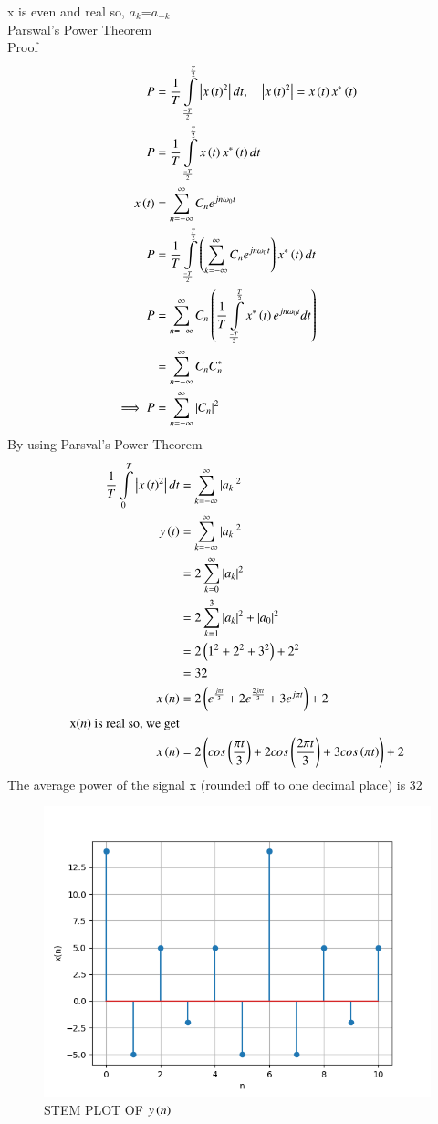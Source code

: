 \documentclass[a4,12pt,onecolumn]{IEEEtran}
\begin{document}
x is even and real so, $a_k$=$a_{-k}$\\
Parswal's Power Theorem\\
Proof
\begin{align}
P&=\frac{1}{T}\int\limits_{\frac{-T}{2}}^{\frac{T}{2}}\left| x\left(t\right)^2 \right|dt ,\quad{\left| x\ensuremath{\left(t\right)}^2 \right|=x\ensuremath{\left(t\right)}x^*\ensuremath{\left(t\right)}}\\
P&=\frac{1}{T}\int\limits_{\frac{-T}{2}}^{\frac{T}{2}}x\left(t\right)x^*\left(t\right)dt \\
x\left(t\right)&=\sum\limits_{n=-\infty}^{\infty}C_ne^{jn\omega_0t}\\
P&=\frac{1}{T}\int\limits_{\frac{-T}{2}}^{\frac{T}{2}}\left(\sum\limits_{k=-\infty}^{\infty}C_ne^{jn\omega_0t}\right)x^*\left(t\right)dt\\
P&=\sum\limits_{n=-\infty}^{\infty}C_n\left(\frac{1}{T}\int\limits_{\frac{-T}{2}}^{\frac{T}{2}}x^*\left(t\right)e^{jn\omega_0t}dt\right)\\
&=\sum\limits_{n=-\infty}^{\infty}C_nC^*_n\\
\implies P&=\sum\limits_{n=-\infty}^{\infty}\left| C_n \right|^2
\end{align}
By using Parsval's Power Theorem
\begin{align}
\frac{1}{T}\int\limits_{0}^{T}\left| x\left(t\right)^2 \right|dt&=\sum\limits_{k=-\infty}^{\infty}\left| a_k \right|^2\\
y\left(t\right)&=\sum\limits_{k=-\infty}^{\infty}\left| a_k \right|^2\\
&=2\sum\limits_{k=0}^{\infty}\left| a_k \right|^2\\
&=2\sum\limits_{k=1}^{3}\left| a_k \right|^2  +|a_0|^2 \\
&=2\left(1^2+2^2+3^2\right)+2^2\\
&=32\\
x\left(n\right)&=2\left(e^{\frac{j\pi t}{3}}+2e^{\frac{2j\pi t}{3}}+3e^{j\pi t}\right) + 2\\
\text{x\ensuremath{\left(n\right)} is real so, we get}\\
x\left(n\right)&=2\left(cos\left(\frac{\pi t}{3}\right)+2cos\left(\frac{2\pi t}{3}\right)+3cos\left(\pi t\right)\right) + 2
\end{align}
The average power of the signal x (rounded off to one decimal place) is $32$
\begin{figure}[ht!]
\includegraphics[width=\columnwidth]{figs/fig.png}
\caption{\large{STEM PLOT OF $y\left(n\right)$}}
\end{figure}
\end{document}
